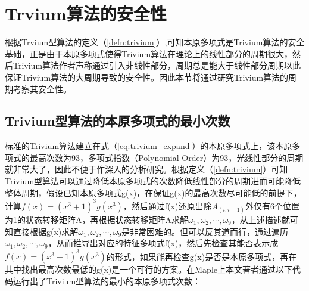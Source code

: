 \section{Trvium算法的安全性}
根据Trvium型算法的定义（\ref{defn:trivium}）,可知本原多项式是Trivium算法的安全基础，正是由于本原多项式使得Trivium算法在理论上的线性部分的周期很大，然后Trivium算法作者声称通过引入非线性部分，周期总是能大于线性部分周期以此保证Trivium算法的大周期导致的安全性。因此本节将通过研究Trivium算法的周期考察其安全性。

\subsection{Trivium型算法的本原多项式的最小次数}
标准的Trivium算法建立在式（\ref{eq:trivium_expand}）的本原多项式上，该本原多项式的最高次数为93，多项式指数（Polynomial Order）为93，光线性部分的周期就非常大了，因此不便于作深入的分析研究。根据定义（\ref{defn:trivium}）可知Trivium型算法可以通过降低本原多项式的次数降低线性部分的周期进而可能降低整体周期，假设已知本原多项式g(x)，在保证g(x)的最高次数尽可能低的前提下，计算$f(x)=(x^{3}+1)^{3}g(x^{3})$，然后通过f(x)还原出除$A_{(i,i-1)}$外仅有6个位置为1的状态转移矩阵A，再根据状态转移矩阵A求解$\omega_{1},\omega_{2},\cdots,\omega_{9}$，从上述描述就可知直接根据g(x)求解$\omega_{1},\omega_{2},\cdots,\omega_{9}$是非常困难的。但可以反其道而行，通过遍历$\omega_{1},\omega_{2},\cdots,\omega_{9}$，从而推导出对应的特征多项式f(x)，然后先检查其能否表示成$f(x)=(x^{3}+1)^{3}g(x^{3})$的形式，如果能再检查g(x)是否是本原多项式，再在其中找出最高次数最低的g(x)是一个可行的方案。在Maple上本文著者通过以下代码运行出了Trivium型算法的最小的本原多项式次数：

